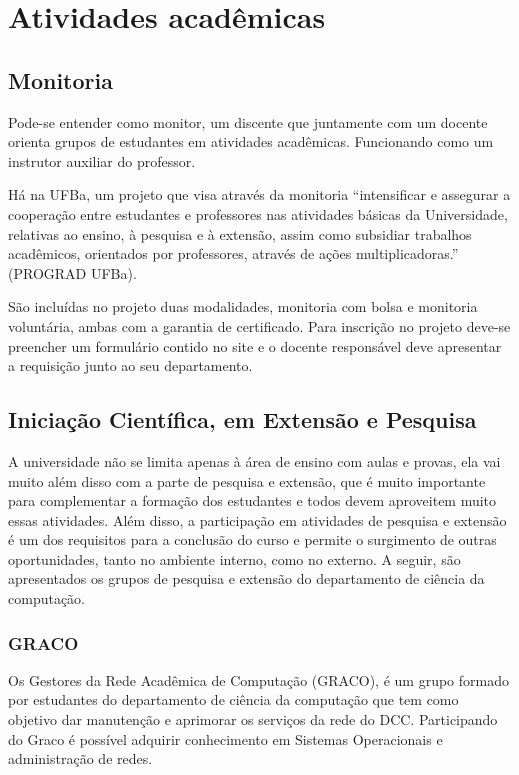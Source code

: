 \chapter{Atividades acadêmicas}

\section{Monitoria}
    \par Pode-se entender como monitor, um discente que juntamente com um docente orienta grupos de estudantes em atividades acadêmicas. Funcionando como um instrutor auxiliar do professor.  \par Há na UFBa, um projeto que visa através da monitoria “intensificar e assegurar a cooperação entre estudantes e professores nas atividades básicas da Universidade, relativas ao ensino, à pesquisa e à extensão, assim como subsidiar trabalhos acadêmicos, orientados por professores, através de ações multiplicadoras.” (PROGRAD UFBa).  \par São incluídas no projeto duas modalidades, monitoria com bolsa e monitoria voluntária, ambas com a garantia de certificado. Para inscrição no projeto deve-se preencher um formulário contido no site e o docente responsável deve apresentar a requisição junto ao seu departamento.

\section{Iniciação Científica, em Extensão e Pesquisa} 
    \par A universidade não se limita apenas à área de ensino com aulas e provas, ela vai muito além disso com a parte de pesquisa e extensão, que é muito importante para complementar a formação dos estudantes e todos devem aproveitem muito essas atividades. Além disso, a participação em atividades de pesquisa e extensão é um dos requisitos para a conclusão do curso e permite o surgimento de outras oportunidades, tanto no ambiente interno, como no externo. A seguir, são apresentados os grupos de pesquisa e extensão do departamento de ciência da computação.
    
    \subsection{GRACO}
        \par Os Gestores da Rede Acadêmica de Computação (GRACO), é um grupo formado por estudantes do departamento de ciência da computação que tem como objetivo dar manutenção e aprimorar os serviços da rede do DCC. Participando do Graco é possível adquirir conhecimento em Sistemas Operacionais e administração de redes.
        
